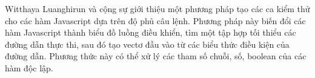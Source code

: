 Witthaya Luanghirun và cộng sự \cite {js_based_statement_coverage} giới thiệu một phương pháp tạo các ca kiểm thử cho các hàm Javascript dựa trên độ phủ câu lệnh. Phương pháp này biến đổi các hàm Javascript thành biểu đồ luồng điều khiển, tìm một tập hợp tối thiểu các đường dẫn thực thi, sau đó tạo vectơ đầu vào từ các biểu thức điều kiện của đường dẫn. Phương thức này có thể xử lý các tham số chuỗi, số, boolean của các hàm độc lập.
